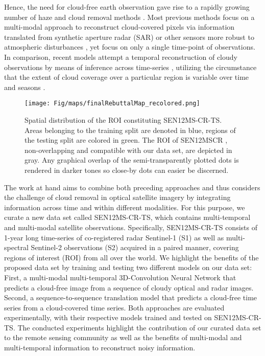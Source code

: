 \documentclass[journal]{IEEEtran}
\begin{document}
Hence, the need for cloud-free earth observation gave rise to a rapidly growing number of haze and cloud removal methods \cite{Enomoto_Sakurada_Wang_Fukui_Matsuoka_Nakamura_Kawaguchi_2017, Grohnfeldt_Schmitt_Zhu_2018, Singh_Komodakis_2018,  Bermudez_Happ_Feitosa_Oliveira_2019, Rafique_Blanton_Jacobs, gu2019single, Sarukkai_Jain_Uzkent_Ermon_2019, meraner2020cloud, ebel2020multisensor}. Most previous methods focus on a multi-modal approach \cite{Grohnfeldt_Schmitt_Zhu_2018, ebel2020cloud, meraner2020cloud, ebel2020multisensor} to reconstruct cloud-covered pixels via information translated from synthetic aperture radar (SAR) or other sensors more robust to atmospheric disturbances \cite{bamler2000principles}, yet focus on only a single time-point of observations. In comparison, recent models attempt a temporal reconstruction of cloudy observations by means of inference across time-series \cite{Sarukkai_Jain_Uzkent_Ermon_2019, oehmcke2020creating, zhang2021combined}, utilizing the circumstance that the extent of cloud coverage over a particular region is variable over time and seasons \cite{King_Platnick_Menzel_Ackerman_Hubanks_2013}.

\begin{figure*}[h!tb]
    \centering  
    \texttt{[image: Fig/maps/finalRebuttalMap\_recolored.png]}
    \caption{Spatial distribution of the ROI constituting SEN12MS-CR-TS. Areas belonging to the training split are denoted in blue, regions of the testing split are colored in green. The ROI of SEN12MSCR \cite{ebel2020multisensor}, non-overlapping and compatible with our data set, are depicted in gray. Any graphical overlap of the semi-transparently plotted dots is rendered in darker tones so close-by dots can easier be discerned.}
    \label{fig:map}
\end{figure*}


The work at hand aims to combine both preceding approaches and thus considers the challenge of cloud removal in optical satellite imagery by integrating information across time and within different modalities. For this purpose, we curate a new data set called SEN12MS-CR-TS, which contains multi-temporal and multi-modal satellite observations. Specifically, SEN12MS-CR-TS consists of 1-year long time-series of co-registered radar Sentinel-1 (S1) as well as multi-spectral Sentinel-2 observations (S2) acquired in a paired manner, covering regions of interest (ROI) from all over the world. We highlight the benefits of the proposed data set by training and testing two different models on our data set: First, a multi-modal multi-temporal 3D-Convolution Neural Network that predicts a cloud-free image from a sequence of cloudy optical and radar images. Second, a sequence-to-sequence translation model that predicts a cloud-free time series from a cloud-covered time series. Both approaches are evaluated experimentally, with their respective models trained and tested on SEN12MS-CR-TS. The conducted experiments highlight the contribution of our curated data set to the remote sensing community as well as the benefits of multi-modal and multi-temporal information to reconstruct noisy information.
\end{document}
